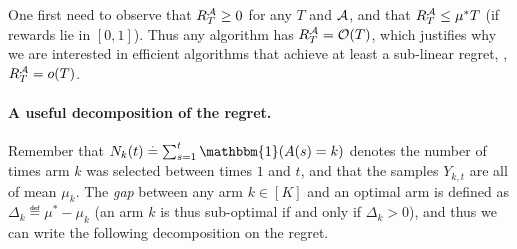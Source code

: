 One first need to observe that $R_T^{\mathcal{A}} \geq 0$ for any $T$ and $\mathcal{A}$, and that $R_T^{\mathcal{A}} \leq \mu^* T$ (if rewards lie in $[0,1]$).
Thus any algorithm has $R_T^{\mathcal{A}} = \mathop{}\mathopen{}\mathcal{O}\mathopen{}\left(T\right)$, which justifies why we are interested in efficient algorithms that achieve at least a sub-linear regret, \ie, $R_T^{\mathcal{A}} = \mathop{}\mathopen{}o\mathopen{}\left(T\right)$.

\paragraph{A useful decomposition of the regret.}
%
Remember that $N_k(t) \eqdef \sum_{s=1}^t \mathbbm{1}(A(s) = k)$ denotes the number of times arm $k$ was selected between times $1$ and $t$,
%
and that the samples $Y_{k,t}$ are all \iid{} of mean $\mu_k$.
The \emph{gap} between any arm $k\in[K]$ and an optimal arm is defined as $\Delta_k \eqdef \mu^* - \mu_k$
(an arm $k$ is thus sub-optimal if and only if $\Delta_k > 0$),
and thus we can write the following decomposition on the regret.

